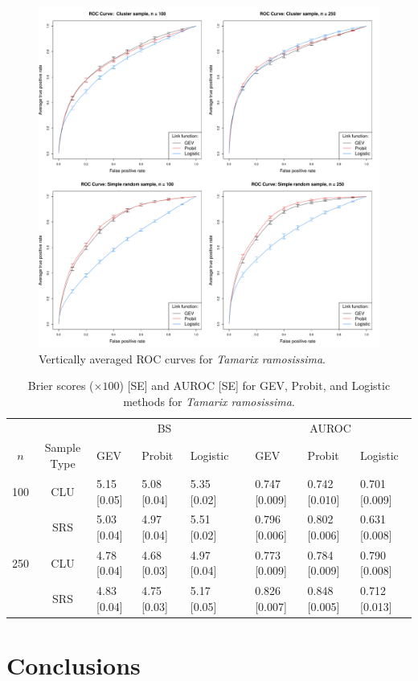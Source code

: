 \begin{figure}
  \includegraphics[width=\linewidth]{plots/data-perf-species1}
  \caption{Vertically averaged ROC curves for \emph{Tamarix ramosissima}.}
  \label{rbfig:simrocgev}
\end{figure}

\begin{table}
  \caption{Brier scores ($\times 100$) [SE] and AUROC [SE] for GEV, Probit, and Logistic methods for \emph{Tamarix ramosissima}.}
  \label{rbtbl:simbsresults}
  \centering
  \footnotesize
  \begin{tabular}{cclllclll}
  \toprule
    \multicolumn{2}{c}{ }& \multicolumn{3}{c}{BS} & \phantom{abc} & \multicolumn{3}{c}{AUROC}\\
    \cmidrule{3-5} \cmidrule{7-9}
    \multicolumn{1}{c}{$n$} & \multicolumn{1}{c}{Sample Type} & GEV    & Probit & Logistic & \phantom{abc} & GEV    & Probit & Logistic \\
  \midrule
  100 & CLU & 5.15 [0.05] & 5.08 [0.04] & 5.35 [0.02] && 0.747 [0.009] & 0.742
      [0.010] & 0.701 [0.009]\\
      & SRS & 5.03 [0.04] & 4.97 [0.04] & 5.51 [0.02] && 0.796 [0.006] & 0.802
      [0.006] & 0.631 [0.008]\\
  250 & CLU & 4.78 [0.04] & 4.68 [0.03] & 4.97 [0.04] && 0.773 [0.009] & 0.784
      [0.009] & 0.790 [0.008]\\
      & SRS & 4.83 [0.04] & 4.75 [0.03] & 5.17 [0.05] && 0.826 [0.007] & 0.848
      [0.005] & 0.712 [0.013]\\
  \bottomrule
  \end{tabular}
\end{table}

\section{Conclusions}\label{rbs:conclusions}